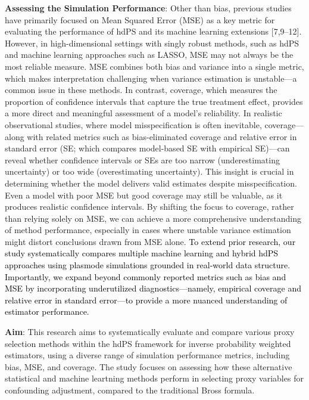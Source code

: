 \documentclass[10pt,letterpaper]{article}
\begin{document}
\textbf{Assessing the Simulation Performance}: Other than bias, previous
studies have primarily focused on Mean Squared Error (MSE) as a key
metric for evaluating the performance of hdPS and its machine learning
extensions {[}7,9--12{]}. However, in high-dimensional settings with
singly robust methods, such as hdPS and machine learning approaches such
as LASSO, MSE may not always be the most reliable measure. MSE combines
both bias and variance into a single metric, which makes interpretation
challenging when variance estimation is unstable---a common issue in
these methods. In contrast, coverage, which measures the proportion of
confidence intervals that capture the true treatment effect, provides a
more direct and meaningful assessment of a model's reliability. In
realistic observational studies, where model misspecification is often
inevitable, coverage---along with related metrics such as
bias-eliminated coverage and relative error in standard error (SE; which
compares model-based SE with empirical SE)---can reveal whether
confidence intervals or SEs are too narrow (underestimating uncertainty)
or too wide (overestimating uncertainty). This insight is crucial in
determining whether the model delivers valid estimates despite
misspecification. Even a model with poor MSE but good coverage may still
be valuable, as it produces realistic confidence intervals. By shifting
the focus to coverage, rather than relying solely on MSE, we can achieve
a more comprehensive understanding of method performance, especially in
cases where unstable variance estimation might distort conclusions drawn
from MSE alone.
\textcolor{black}{To extend prior research, our study systematically compares multiple machine learning and hybrid hdPS approaches using plasmode simulations grounded in real-world data structure. Importantly, we expand beyond commonly reported metrics such as bias and MSE by incorporating underutilized diagnostics—namely, empirical coverage and relative error in standard error—to provide a more nuanced understanding of estimator performance.}

\textbf{Aim}: This research aims to systematically evaluate and compare
various proxy selection methods within the hdPS framework for inverse
probability weighted estimators, using a diverse range of simulation
performance metrics, including bias, MSE, and coverage. The study
focuses on assessing how these alternative statistical and machine
leartning methods perform in selecting proxy variables for confounding
adjustment, compared to the traditional Bross formula.
\end{document}
